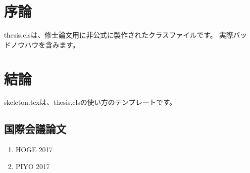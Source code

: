 \documentclass{thesis}
\begin{document}
\begin{abstract}{概要} %
    ここは、概要です。
\end{abstract}
\begin{abstract}{Abstract} %
    Here is abstract.
\end{abstract}
\frontmatter
\tableofcontents %
\listoffigures %
\listoftables %

\mainmatter %
\chapter{序論}
thesis.clsは、修士論文用に非公式に製作されたクラスファイルです。
実際バッドノウハウを含みます。

\chapter{結論}
skeleton.texは、thesis.clsの使い方のテンプレートです。

\begin{thebibliography}{} %
\end{thebibliography}
%

\newpage
\section*{国際会議論文}
\begin{enumerate}[{1)}]
    \item HOGE 2017
    \item PIYO 2017
\end{enumerate}

\appendix %
\end{document}
